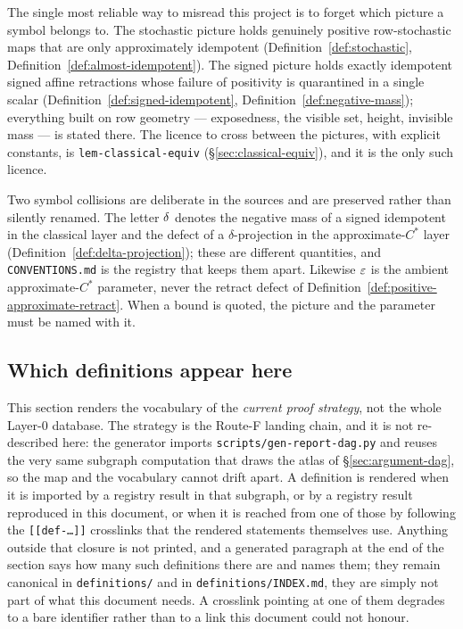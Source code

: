 The single most reliable way to misread this project is to forget which picture a symbol
belongs to. The stochastic picture holds genuinely positive row-stochastic maps that are
only approximately idempotent (Definition~\ref{def:stochastic},
Definition~\ref{def:almost-idempotent}). The signed picture holds exactly idempotent
signed affine retractions whose failure of positivity is quarantined in a single scalar
(Definition~\ref{def:signed-idempotent}, Definition~\ref{def:negative-mass}); everything
built on row geometry --- exposedness, the visible set, height, invisible mass --- is
stated there. The licence to cross between the pictures, with explicit constants, is
\texttt{lem-classical-equiv} (\S\ref{sec:classical-equiv}), and it is the only such
licence.

Two symbol collisions are deliberate in the sources and are preserved rather than silently
renamed. The letter $\delta$ denotes the negative mass of a signed idempotent in the
classical layer and the defect of a $\delta$-projection in the approximate-$C^{*}$ layer
(Definition~\ref{def:delta-projection}); these are different quantities, and
\texttt{CONVENTIONS.md} is the registry that keeps them apart. Likewise $\varepsilon$ is the
ambient approximate-$C^{*}$ parameter, never the retract defect of
Definition~\ref{def:positive-approximate-retract}. When a bound is quoted, the picture and
the parameter must be named with it.

\subsection*{Which definitions appear here}

This section renders the vocabulary of the \emph{current proof strategy}, not the whole
Layer-0 database. The strategy is the Route-F landing chain, and it is not re-described
here: the generator imports \texttt{scripts/gen-report-dag.py} and reuses the very same
subgraph computation that draws the atlas of \S\ref{sec:argument-dag}, so the map and the
vocabulary cannot drift apart. A definition is rendered when it is imported by a registry
result in that subgraph, or by a registry result reproduced in this document, or when it is
reached from one of those by following the \texttt{[[def-\dots]]} crosslinks that the
rendered statements themselves use. Anything outside that closure is not printed, and a
generated paragraph at the end of the section says how many such definitions there are and
names them; they remain canonical in \texttt{definitions/} and in
\texttt{definitions/INDEX.md}, they are simply not part of what this document needs. A
crosslink pointing at one of them degrades to a bare identifier rather than to a link this
document could not honour.

